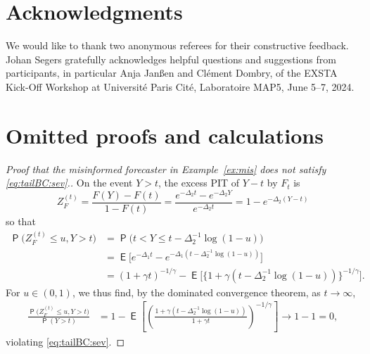 \documentclass[12pt]{article}
\newcommand{\E}{\operatorname{\mathsf{E}}}
\newcommand{\Q}{\operatorname{\mathsf{P}}}
\newcommand{\1}{\mathbf{1}} %
\newcommand{\ZFt}{Z_{F}^{(t)}} %
\theoremstyle{definition}
\begin{document}
\section*{Acknowledgments}

We would like to thank two anonymous referees for their constructive feedback. Johan Segers gratefully acknowledges helpful questions and suggestions from participants, in particular Anja Jan\ss{}en and Cl\'{e}ment Dombry, of the EXSTA Kick-Off Workshop at Universit\'e Paris Cité, Laboratoire MAP5, June 5--7, 2024. 



 

\newpage 
\appendix

\section{Omitted proofs and calculations}
\label{app:proofs}

\begin{proof}[Proof that the misinformed forecaster in Example~\ref{ex:mis} does not satisfy \eqref{eq:tailBC:sev}.]
	On the event $Y > t$, the excess PIT of $Y-t$ by $F_t$ is
	\[
	\ZFt 
	= \frac{F(Y)-F(t)}{1-F(t)} 
	= \frac{e^{-\Delta_2 t} - e^{-\Delta_2 Y}}{e^{-\Delta_2 t}}
	= 1 - e^{-\Delta_2 (Y-t)}
	\]
	so that
	\begin{align*}
		\Q \bigl( \ZFt \le u, Y > t \bigr)
		&= \Q \bigl( t < Y \le t - \Delta_2^{-1} \log(1-u) \bigr) \\
		&= \E \bigl[ e^{-\Delta_1 t} - e^{-\Delta_1 (t - \Delta_2^{-1} \log(1-u))} \bigr] \\
		&= (1+\gamma t)^{-1/\gamma} - 
		\E \bigl[ \bigl\{ 1 + \gamma (t - \Delta_2^{-1}\log(1-u)) \bigr\}^{-1/\gamma} \bigr].
	\end{align*}
	For $u \in (0, 1)$, we thus find, by the dominated convergence theorem, as $t \to \infty$,
	\begin{align*}
		\frac{\Q \bigl( \ZFt \le u, Y > t \bigr)}{\Q( Y > t)}
		&= 1 - \E \left[
		\left(
		\frac{1 + \gamma (t - \Delta_2^{-1} \log(1-u))}{1 + \gamma t}
		\right)^{-1/\gamma}
		\right]
		\to 1-1=0,
	\end{align*}
	violating \eqref{eq:tailBC:sev}.
\end{proof}
\end{document}
